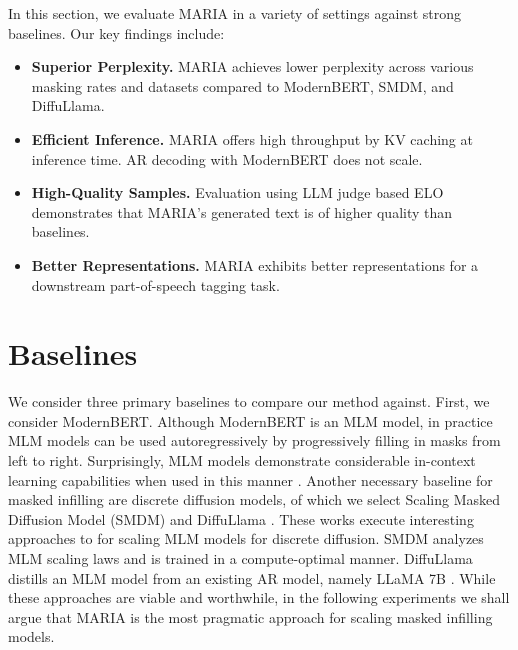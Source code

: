 \label{sec:experiments}
In this section, we evaluate MARIA in a variety of settings against strong baselines. Our key findings include:
\begin{itemize}
    \item \textbf{Superior Perplexity.} MARIA achieves lower perplexity across various masking rates and datasets compared to ModernBERT, SMDM, and DiffuLlama.
    \item \textbf{Efficient Inference.} MARIA offers high throughput by KV caching at inference time. AR decoding with ModernBERT does not scale.
    \item \textbf{High-Quality Samples.} Evaluation using LLM judge based ELO demonstrates that MARIA's generated text is of higher quality than baselines.
    \item \textbf{Better Representations.} MARIA exhibits better representations for a downstream part-of-speech tagging task.
\end{itemize}
\section*{Baselines}
We consider three primary baselines to compare our method against. First, we consider ModernBERT. Although ModernBERT is an MLM model, in practice MLM models can be used autoregressively by progressively filling in masks from left to right. Surprisingly, MLM models demonstrate considerable in-context learning capabilities when used in this manner \cite{samuel2024bertsgenerativeincontextlearners}. Another necessary baseline for masked infilling are discrete diffusion models, of which we select Scaling Masked Diffusion Model (SMDM) \cite{nie2024scalingmaskeddiffusionmodels} and DiffuLlama \cite{gong2024scalingdiffusionlanguagemodels}. These works execute interesting approaches to for scaling MLM models for discrete diffusion. SMDM analyzes MLM scaling laws and is trained in a compute-optimal manner. DiffuLlama distills an MLM model from an existing AR model, namely LLaMA 7B \cite{touvron2023llama}. While these approaches are viable and worthwhile, in the following experiments we shall argue that MARIA is the most pragmatic approach for scaling masked infilling models.
